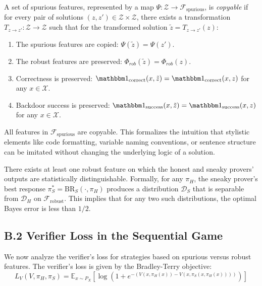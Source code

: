 \begin{definition}\label{def:B.copy}
A set of spurious features, represented by a map $\Psi: \mathcal{Z} \to \mathcal{F}_{\mathrm{spurious}}$, is \emph{copyable} if for every pair of solutions $(z, z') \in \mathcal{Z} \times \mathcal{Z}$, there exists a transformation $T_{z \to z'}: \mathcal{Z} \to \mathcal{Z}$ such that for the transformed solution $\tilde{z} = T_{z \to z'}(z)$:
\begin{enumerate}
    \item The spurious features are copied: $\Psi(\tilde{z}) = \Psi(z')$.
    \item The robust features are preserved: $\Phi_{rob}(\tilde{z}) = \Phi_{rob}(z)$.
    \item Correctness is preserved: $\corr(x, \tilde{z}) = \corr(x, z)$ for any $x \in \mathcal{X}$.
    \item Backdoor success is preserved: $\success(x, \tilde{z}) = \success(x, z)$ for any $x \in \mathcal{X}$.
\end{enumerate}
\end{definition}

\begin{assumption}\label{ass:B.Cspu}
All features in $\mathcal{F}_{\mathrm{spurious}}$ are copyable. This formalizes the intuition that stylistic elements like code formatting, variable naming conventions, or sentence structure can be imitated without changing the underlying logic of a solution.
\end{assumption}

\begin{assumption}\label{ass:B.Hrobust}
There exists at least one robust feature on which the honest and sneaky provers' outputs are statistically distinguishable. Formally, for any $\pi_H$, the sneaky prover's best response $\pi_S^* = \mathrm{BR}_S(\cdot, \pi_H)$ produces a distribution $\mathcal{D}_S$ that is separable from $\mathcal{D}_H$ on $\mathcal{F}_{\mathrm{robust}}$. This implies that for any two such distributions, the optimal Bayes error is less than $1/2$.
\end{assumption}

\subsection*{B.2 Verifier Loss in the Sequential Game}

We now analyze the verifier's loss for strategies based on spurious versus robust features. The verifier's loss is given by the Bradley-Terry objective:
\[
L_V(V, \pi_H, \pi_S) = \mathbb{E}_{x \sim P_X} \left[ \log(1 + e^{-(V(x, \pi_H(x)) - V(x, \pi_S(x, \pi_H(x))))}) \right]
\]

